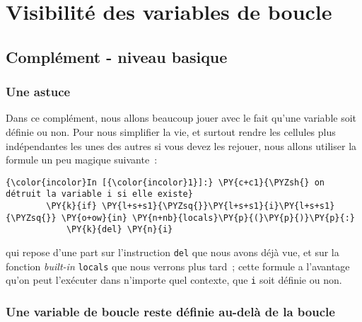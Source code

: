     
    
    
    

    

    \hypertarget{visibilituxe9-des-variables-de-boucle}{%
\section{Visibilité des variables de
boucle}\label{visibilituxe9-des-variables-de-boucle}}

    \hypertarget{compluxe9ment---niveau-basique}{%
\subsection{Complément - niveau
basique}\label{compluxe9ment---niveau-basique}}

    \hypertarget{une-astuce}{%
\subsubsection{Une astuce}\label{une-astuce}}

    Dans ce complément, nous allons beaucoup jouer avec le fait qu'une
variable soit définie ou non. Pour nous simplifier la vie, et surtout
rendre les cellules plus indépendantes les unes des autres si vous devez
les rejouer, nous allons utiliser la formule un peu magique suivante~:

    \begin{Verbatim}[commandchars=\\\{\},frame=single,framerule=0.3mm,rulecolor=\color{cellframecolor}]
{\color{incolor}In [{\color{incolor}1}]:} \PY{c+c1}{\PYZsh{} on détruit la variable i si elle existe}
        \PY{k}{if} \PY{l+s+s1}{\PYZsq{}}\PY{l+s+s1}{i}\PY{l+s+s1}{\PYZsq{}} \PY{o+ow}{in} \PY{n+nb}{locals}\PY{p}{(}\PY{p}{)}\PY{p}{:} 
            \PY{k}{del} \PY{n}{i}
\end{Verbatim}


    qui repose d'une part sur l'instruction \texttt{del} que nous avons déjà
vue, et sur la fonction \emph{built-in} \texttt{locals} que nous verrons
plus tard~; cette formule a l'avantage qu'on peut l'exécuter dans
n'importe quel contexte, que \texttt{i} soit définie ou non.

    \hypertarget{une-variable-de-boucle-reste-duxe9finie-au-deluxe0-de-la-boucle}{%
\subsubsection{Une variable de boucle reste définie au-delà de la
boucle}\label{une-variable-de-boucle-reste-duxe9finie-au-deluxe0-de-la-boucle}}

